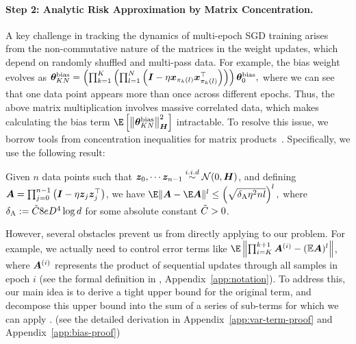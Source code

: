 \paragraph{Step 2: Analytic Risk Approximation by Matrix Concentration.} A key challenge in tracking the dynamics of multi-epoch SGD training arises from the non-commutative nature of the matrices in the weight updates, which depend on randomly shuffled and multi-pass data. 
For example, the bias weight evolves as
${\bm{\theta}}_{KN}^{\mathrm{bias}} = \left(\prod_{k=1}^{K} \left(\prod_{l=1}^{N} \left({\bm{I}}-\eta {\bm{x}}_{\pi_k(l)}{\bm{x}}_{\pi_k(l)}^{\top}\right)\right)\right) {\bm{\theta}}_{0}^{\mathrm{bias}},$
where we can see that one data point appears more than once across different epochs. Thus, the above matrix multiplication involves massive correlated data, which makes calculating the bias term $\E\left[\left\|\vtheta_{KN}^{\bias}\right\|_{\mH}^2\right]$ intractable.
To resolve this issue, we borrow tools from concentration inequalities for matrix products~\citet{huang2022matrix}. Specifically, we use the following result:
\begin{lemma}
\label{lem:un-shuffle-A-EA-expectation-main}
    Given $n$ data points such that ${\bm{z}}_0, \cdots {\bm{z}}_{n-1} \overset{i.i.d}{\sim} \mathcal{N}(0, {\bm{H}})$, and defining ${\bm{A}} = \prod_{j=0}^{n-1}\left({\bm{I}}-\eta {\bm{z}}_{j}{\bm{z}}_{j}^{\top}\right)$, we have
    $\E\|\mA-\E\mA\|^l \leq \left(\sqrt{\deltaA\eta^2nl}\right)^l,$
    where $\delta_{\mathrm{A}}:= \Tilde{C}8eD^4\log d$ for some absolute constant $\Tilde{C} > 0$.
\end{lemma}
However, several obstacles prevent us from directly applying  to our problem. For example, we actually need to control error terms like $\E\left\|\prod_{i=K}^{k+1}\mA^{(i)} - (\mathbb{E}\mA)^l \right\|$, where ${\bm{A}}^{(i)}$ represents the product of sequential updates through all samples in epoch $i$ (see the formal definition in , Appendix~\ref{app:notation}). To address this, our main idea is to derive a tight upper bound for the original term, and decompose this upper bound into the sum of a series of sub-terms for which we can apply . (see the detailed derivation in Appendix~\ref{app:var-term-proof} and Appendix~\ref{app:bias-proof})

